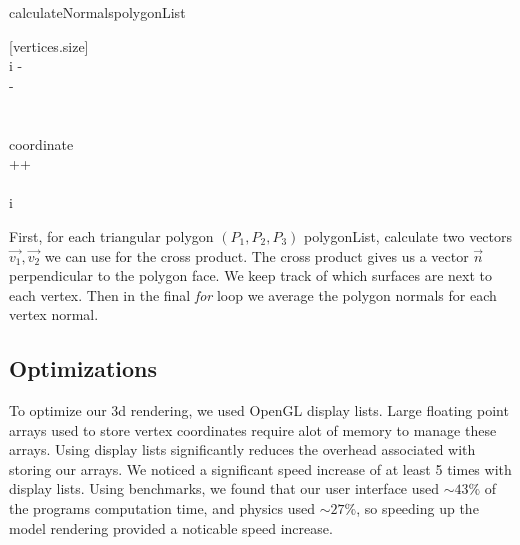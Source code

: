 	\begin{center}
	\begin{pseudocode}[framebox]{calculateNormals}{polygonList}

	[vertices.size]\\
	\FOREACH i \in {} \DO
	\BEGIN
	 \gets{} - \\
	 \gets{} - \\
	 \gets {}\times {}\\\\
		\FOREACH coordinate \in {} \DO
		\BEGIN
			  \\
			++
		\END
	\END
	\\\\
	\FOREACH i \in {} \DO
    \end{pseudocode}
    \end{center}
	
	First, for each triangular polygon \textit{$(P_1, P_2, P_3)$} polygonList, calculate two vectors $\vec{v_1}, \vec{v_2}$ we can use for the cross product. The cross product gives us a vector $\vec{n}$ perpendicular to the polygon face. We keep track of which surfaces are next to each vertex. Then in the final \textit{for} loop we average the polygon normals for each vertex normal.


	\subsection{Optimizations}
	To optimize our 3d rendering, we used OpenGL display lists. Large floating point arrays used to store vertex coordinates require alot of memory to manage these arrays. Using display lists significantly reduces the overhead associated with storing our arrays. We noticed a significant speed increase of at least 5 times with display lists. Using benchmarks, we found that our user interface used $\sim43\%$ of the programs computation time, and physics used $\sim27\%$, so speeding up the model rendering provided a noticable speed increase.

	

	


